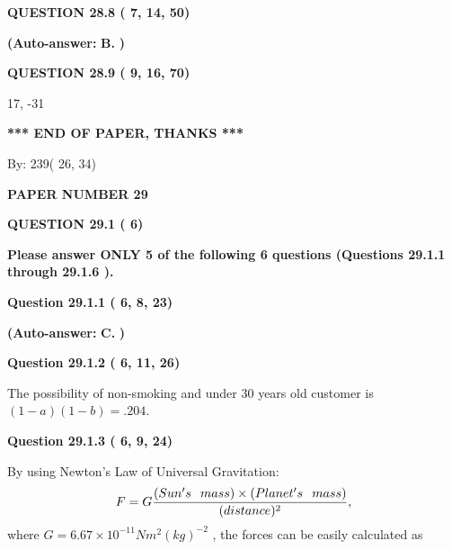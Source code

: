\documentclass[12pt]{article}
\begin{document}
  
  
{\textbf{\large{QUESTION
28.8 
 (          7,         14,         50)
}}}
 
 
{\textbf{(Auto-answer:}}
{\textbf{\large{
B.}}}
{\textbf{)}}
 
 
  
  
{\textbf{\large{QUESTION
28.9 
 (          9,         16,         70)
}}}

17,  %
-31
 
   
   
   
   
\vspace{1.0in} 
{\textbf{\large{ *** END OF PAPER, THANKS *** }}} 
   
   
\hspace{1.0in} By: 
         239(         26,          34)
   
   
   
   
\newpage 
\setcounter{page}{ 
    29001 } 
   
   
 {\textbf{ \Large{ PAPER NUMBER          29 }}}
   
   
   
   
  
\vspace{0.2in}
  
{\textbf{\Large{QUESTION
29.1 
 (          6)
}}}
  
  
{\textbf{\Large{Please answer ONLY  %
           5 %
 of the following  %
           6 %
 questions (Questions  %
29.1.1 %
 through  %
29.1.6 %
 ). }}}
   
   
  
  
{\textbf{\large{Question
29.1.1 
 (          6,          8,         23)
}}}
 
 
{\textbf{(Auto-answer:}}
{\textbf{\large{
C.}}}
{\textbf{)}}
 
 
  
  
{\textbf{\large{Question
29.1.2 
 (          6,         11,         26)
}}}

The possibility of  %
 non-smoking and  %
under 30 years old
customer is $ (1-a)(1-b) =  %
.204 $.
  
  
{\textbf{\large{Question
29.1.3 
 (          6,          9,         24)
}}}

By using Newton's Law of Universal Gravitation:
\[
F=G \frac{(Sun's \hspace{0.1in} mass) \times (Planet's \hspace{0.1in} mass)} { (distance)^2},
\]
where
$ G= %
6.67 \times 10^{-11} N m^{2}(kg)^{-2}$ , the forces can be easily calculated as
 
\end{document}
